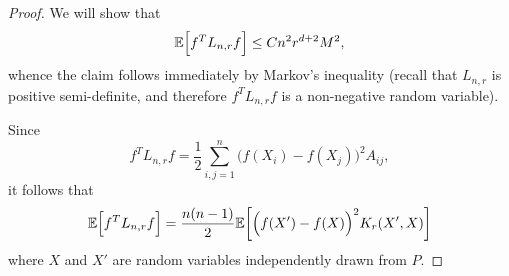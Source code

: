 \documentclass{article}
\newcommand{\1}{\mathbf{1}}
\newcommand{\Lap}{L}
\newcommand{\Ebb}{\mathbb{E}}
\theoremstyle{alden}
\theoremstyle{aldenthm}
\theoremstyle{definition}
\theoremstyle{remark}
\begin{document}
\begin{proof}
	We will show that
	\begin{equation*}
	\Ebb\Bigl[f^T \Lap_{n,r} f\Bigr] \leq C n^2 r^{d + 2} M^2,
	\end{equation*}
	whence the claim follows immediately by Markov's inequality (recall that $\Lap_{n,r}$ is positive semi-definite, and therefore $f^T \Lap_{n,r} f$ is a non-negative random variable).
	
	Since
	\begin{equation*}
	f^T \Lap_{n,r} f = \frac{1}{2}\sum_{i, j = 1}^{n} \bigl(f(X_i) - f(X_j)\bigr)^2 A_{ij},
	\end{equation*}
	it follows that
	\begin{equation}
	\label{pf:first_order_graph_sobolev_seminorm_1}
	\Ebb\Bigl[f^T \Lap_{n,r} f\Bigr] = \frac{n(n - 1)}{2} \Ebb\biggl[\Bigl(f(X') - f(X)\Bigr)^2 K_r(X',X)\biggr]
	\end{equation}
	where $X$ and $X'$ are random variables independently drawn from $P$. 
	

\end{proof}
\end{document}
